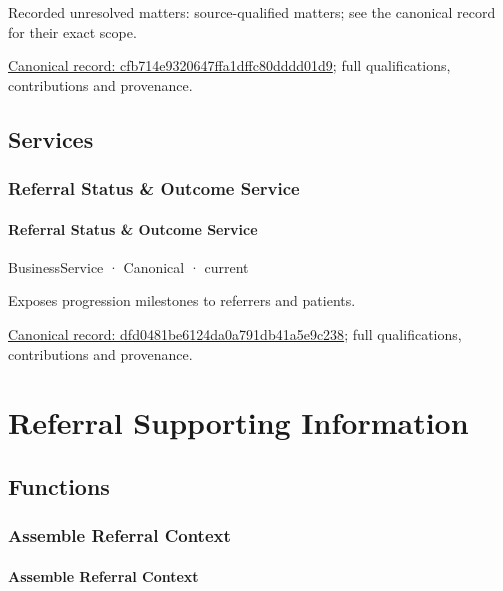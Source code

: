 {\small Recorded unresolved matters: source-qualified matters; see the canonical record for their exact scope.}\par
{\footnotesize \href{../../../../continuum/business/business-process/cfb714e9320647ffa1dffc80dddd01d9.md}{Canonical record: cfb714e9320647ffa1dffc80dddd01d9}; full qualifications, contributions and provenance.}\par
\subsection{Services}

\subsubsection{Referral Status \& Outcome Service}

\paragraph{Referral Status \& Outcome Service}

\label{element:dfd0481be6124da0a791db41a5e9c238}
{\small BusinessService · Canonical · current}\par

Exposes progression milestones to referrers and patients.


{\footnotesize \href{../../../../continuum/business/business-service/dfd0481be6124da0a791db41a5e9c238.md}{Canonical record: dfd0481be6124da0a791db41a5e9c238}; full qualifications, contributions and provenance.}\par
\section{Referral Supporting Information}

\subsection{Functions}

\subsubsection{Assemble Referral Context}

\paragraph{Assemble Referral Context}

